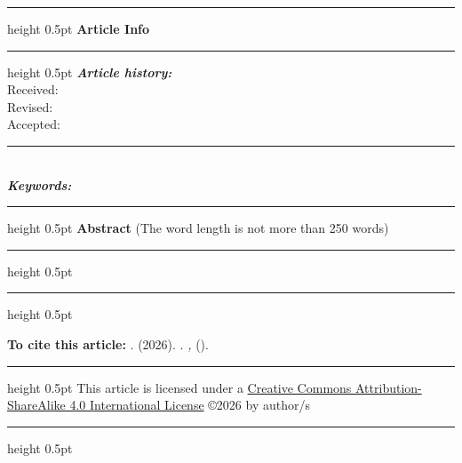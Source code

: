 {  %
  \vspace{0.1cm}
  \noindent
  \begin{minipage}[t]{0.3\textwidth}
    \hrule height 0.5pt
    \vspace{0.15cm}
    \textbf{Article Info}
    \vspace{0.15cm}
    \hrule height 0.5pt
    \vspace{0.15cm}
    \textit{\textbf{Article history:}}\\[0.1cm]
    {\small
    Received: \@receiveddate\\
    Revised: \@reviseddate\\
    Accepted: \@accepteddate\\[0.1cm]
    }
    \rule{\textwidth}{0.5pt}\\[0.1cm]
    \textit{\textbf{Keywords:}}\\[0.1cm]
    {\small \@articlekeywords}
  \end{minipage}
  \hfill
  \begin{minipage}[t]{0.65\textwidth}
    \hrule height 0.5pt
    \vspace{0.15cm}
    \textbf{Abstract} (The word length is not more than 250 words)
    \vspace{0.15cm}
    \hrule height 0.5pt
    \vspace{0.15cm}
    \@articleabstract
  \end{minipage}
  \vspace{0.3cm}
  \hrule height 0.5pt
  \vspace{0.1cm}
  \noindent
  {\small
  \textbf{To cite this article:} \@runningauthor. (2026). \@articletitle. \textit{\@journalname, \@journalvolume}(\@journalissue).\par
  \vspace{0.1cm}
  \hrule height 0.5pt
  \vspace{0.1cm}
  \noindent
  This article is licensed under a \href{https://creativecommons.org/licenses/by-sa/4.0/}{Creative Commons Attribution-ShareAlike 4.0 International License} \copyright 2026 by author/s\par
  }
  \vspace{0.1cm}
  \hrule height 0.5pt
}
